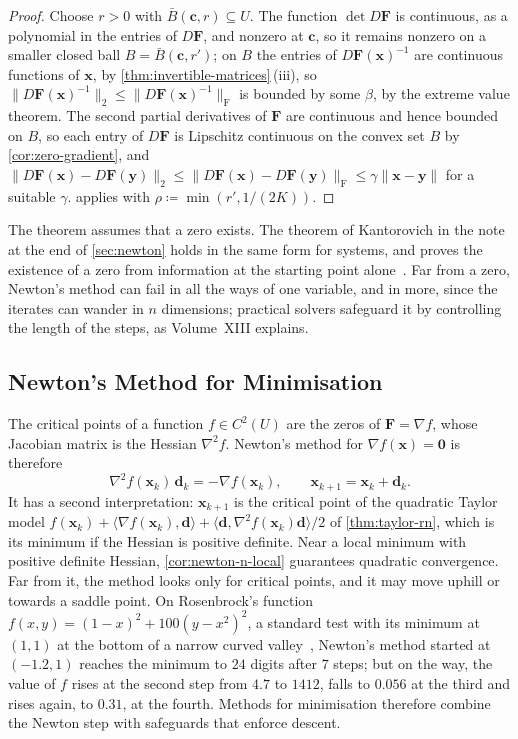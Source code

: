 \begin{proof}
Choose $r>0$ with $\bar B(\mathbf c,r)\subseteq U$. The function $\det D\mathbf F$ is continuous, as a polynomial in the entries of $D\mathbf F$, and nonzero at $\mathbf c$, so it remains nonzero on a smaller closed ball $B=\bar B(\mathbf c,r')$; on $B$ the entries of $D\mathbf F(\mathbf x)^{-1}$ are continuous functions of $\mathbf x$, by \cref{thm:invertible-matrices}\,(iii), so $\|D\mathbf F(\mathbf x)^{-1}\|_2\le\|D\mathbf F(\mathbf x)^{-1}\|_{\mathrm F}$ is bounded by some $\beta$, by the extreme value theorem. The second partial derivatives of $\mathbf F$ are continuous and hence bounded on $B$, so each entry of $D\mathbf F$ is Lipschitz continuous on the convex set $B$ by \cref{cor:zero-gradient}, and $\|D\mathbf F(\mathbf x)-D\mathbf F(\mathbf y)\|_2\le\|D\mathbf F(\mathbf x)-D\mathbf F(\mathbf y)\|_{\mathrm F}\le\gamma\|\mathbf x-\mathbf y\|$ for a suitable $\gamma$.  applies with $\rho\coloneqq\min(r',1/(2K))$.
\end{proof}

The theorem assumes that a zero exists. The theorem of Kantorovich in the note at the end of \cref{sec:newton} holds in the same form for systems, and proves the existence of a zero from information at the starting point alone~\cite{ortega2000}. Far from a zero, Newton's method can fail in all the ways of one variable, and in more, since the iterates can wander in $n$ dimensions; practical solvers safeguard it by controlling the length of the steps, as Volume~XIII explains.

\subsection{Newton's Method for Minimisation}

The critical points of a function $f\in C^2(U)$ are the zeros of $\mathbf F=\nabla f$, whose Jacobian matrix is the Hessian $\nabla^2f$. Newton's method for $\nabla f(\mathbf x)=\mathbf0$ is therefore
\[
\nabla^2f(\mathbf x_k)\,\mathbf d_k=-\nabla f(\mathbf x_k),\qquad\mathbf x_{k+1}=\mathbf x_k+\mathbf d_k .
\]
It has a second interpretation: $\mathbf x_{k+1}$ is the critical point of the quadratic Taylor model $f(\mathbf x_k)+\langle\nabla f(\mathbf x_k),\mathbf d\rangle+\langle\mathbf d,\nabla^2f(\mathbf x_k)\mathbf d\rangle/2$ of \cref{thm:taylor-rn}, which is its minimum if the Hessian is positive definite. Near a local minimum with positive definite Hessian, \cref{cor:newton-n-local} guarantees quadratic convergence. Far from it, the method looks only for critical points, and it may move uphill or towards a saddle point. On Rosenbrock's function $f(x,y)=(1-x)^2+100(y-x^2)^2$, a standard test with its minimum at $(1,1)$ at the bottom of a narrow curved valley~\cite{rosenbrock1960}, Newton's method started at $(-1.2,1)$ reaches the minimum to $24$ digits after $7$ steps; but on the way, the value of $f$ rises at the second step from $4.7$ to $1412$, falls to $0.056$ at the third and rises again, to $0.31$, at the fourth. Methods for minimisation therefore combine the Newton step with safeguards that enforce descent.

